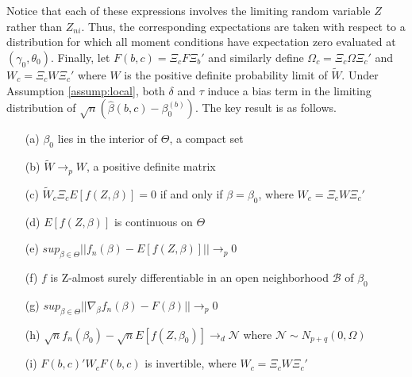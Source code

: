 Notice that each of these expressions involves the limiting random variable $Z$ rather than $Z_{ni}$. 
Thus, the corresponding expectations are taken with respect to a distribution for which all moment conditions have expectation zero  evaluated at $(\gamma_0,\theta_0)$.
Finally, let $F(b,c) = \Xi_c F \Xi_b'$ and similarly define $\Omega_c = \Xi_c \Omega \Xi_c'$ and $W_c = \Xi_c W \Xi_c'$ where $W$ is the positive definite probability limit of $\widetilde{W}$. 
Under Assumption \ref{assump:local}, both $\delta$ and $\tau$ induce a bias term in the limiting distribution of $\sqrt{n}\left(\widehat{\beta}(b,c) - \beta_0^{(b)}\right)$. 
The key result is as follows.
\begin{assump}
  \label{assump:high-level}
    \mbox{}
\begin{itemize}
\item[(a)] $\beta_0$ lies in the interior of $\Theta$, a compact set
\item[(b)] $\widetilde{W} \rightarrow_{p} W$, a positive definite matrix
\item[(c)] $\widetilde{W}_c \Xi_c E[f(Z, \beta)] = 0$ if and only if $\beta = \beta_0$, where $W_c = \Xi_c W \Xi_c'$
\item[(d)] $E[f(Z,\beta)]$ is continuous on $\Theta$
\item[(e)] $sup_{\beta\in \Theta} ||f_n(\beta) - E[f(Z,\beta)]||\rightarrow_p 0$
\item[(f)] $f$ is Z-almost surely differentiable in an open neighborhood $\mathcal{B}$ of $\beta_0$
\item[(g)] $sup_{\beta \in \Theta} ||\nabla_{\beta} f_n(\beta) - F(\beta)|| \rightarrow_p 0 $
\item[(h)] $\sqrt{n}f_n(\beta_0) - \sqrt{n}E[f(Z,\beta_0)] \rightarrow_d \mathscr{N}$ where $\mathscr{N} \sim N_{p+q}(0,\Omega)$
\item[(i)] $F(b,c)' W_c F(b,c)$ is invertible, where $W_c = \Xi_c W \Xi_c'$
\end{itemize}
\end{assump}
